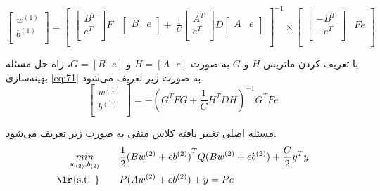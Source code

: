  \begin{equation}\label{eq:77}
 \left[ \begin{matrix}
 {{w}^{\left( 1 \right)}}  \\
 {{b}^{\left( 1 \right)}}  \\
 \end{matrix} \right]={{\left[ \begin{matrix}
 		\left[ \begin{matrix}
 		{{B}^{T}}  \\
 		{{e}^{T}}  \\
 		\end{matrix} \right]F & \left[ \begin{matrix}
 		B & e  \\
 		\end{matrix} \right]+~\frac{1}{C}\left[ \begin{matrix}
 		{{A}^{T}}  \\
 		{{e}^{T}}  \\
 		\end{matrix} \right]D\left[ \begin{matrix}
 		A & e  \\
 		\end{matrix} \right]  \\
 		\end{matrix} \right]}^{-1}} \times \left[ \begin{matrix}
 \left[ \begin{matrix}
 -{{B}^{T}}  \\
 -{{e}^{T}}  \\
 \end{matrix} \right] & Fe  \\
 \end{matrix} \right]
 \end{equation}
 
با تعریف کردن ماتریس $H$ و $G$ به صورت $H=[A\text{ }e]$ و $G=[B\text{ }e]$، راه حل مسئله بهینه‌سازی \ref{eq:71} به صورت زیر تعریف می‌شود.
\begin{equation}\label{eq:78}
\left[ \begin{matrix}
{{w}^{\left( 1 \right)}}  \\
{{b}^{\left( 1 \right)}}  \\
\end{matrix} \right] = -{{({{G}^{T}}FG+\frac{1}{C}{{H}^{T}}DH)}^{-1}}{{G}^{T}}Fe
\end{equation}

مسئله اصلی تغییر یافته کلاس منفی به صورت زیر تعریف می‌شود.
\begin{equation}\label{eq:79}
\begin{split}
\mathop{{ min}}\limits_{w_{(2)} ,b_{(2)}} \qquad & \frac{1}{2}{{(B{{w}^{\left( 2 \right)}}+e{{b}^{\left( 2 \right)}})}^{T}}Q(B{{w}^{\left( 2 \right)}}+e{{b}^{\left( 2 \right)}})+\frac{C}{2}{{y}^{T}}y \\
\textrm{\lr{s.t. }} \qquad & P(A{{w}^{\left( 2 \right)}}+e{{b}^{\left( 2\right)}})+y=Pe
\end{split}
\end{equation}

